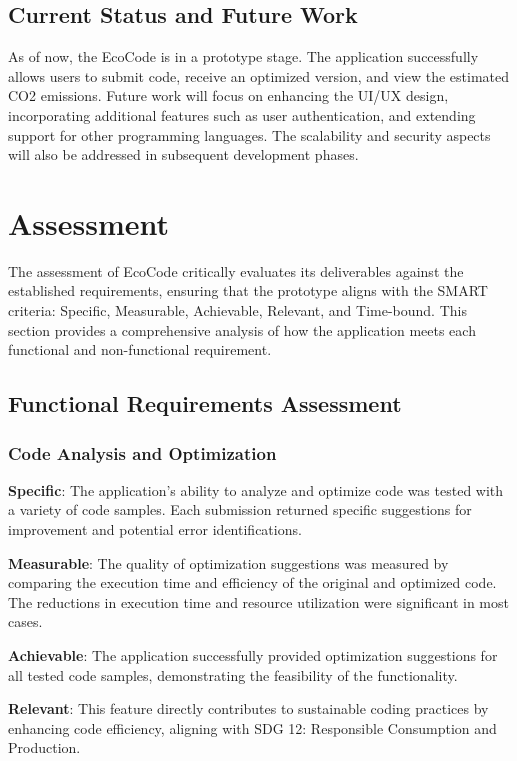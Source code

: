 \documentclass[conference,compsoc]{IEEEtran}
\begin{document}
\subsection{Current Status and Future Work}
As of now, the EcoCode is in a prototype stage. The application successfully allows users to submit  code, receive an optimized version, and view the estimated CO2 emissions. Future work will focus on enhancing the UI/UX design, incorporating additional features such as user authentication, and extending support for other programming languages. The scalability and security aspects will also be addressed in subsequent development phases.

\section{Assessment}
The assessment of EcoCode critically evaluates its deliverables against the established requirements, ensuring that the prototype aligns with the SMART criteria: Specific, Measurable, Achievable, Relevant, and Time-bound. This section provides a comprehensive analysis of how the application meets each functional and non-functional requirement.

\subsection{Functional Requirements Assessment}
\subsubsection{Code Analysis and Optimization}

\textbf{Specific}: The application's ability to analyze and optimize  code was tested with a variety of code samples. Each submission returned specific suggestions for improvement and potential error identifications.

\textbf{Measurable}: The quality of optimization suggestions was measured by comparing the execution time and efficiency of the original and optimized code. The reductions in execution time and resource utilization were significant in most cases.

\textbf{Achievable}: The application successfully provided optimization suggestions for all tested code samples, demonstrating the feasibility of the functionality.

\textbf{Relevant}: This feature directly contributes to sustainable coding practices by enhancing code efficiency, aligning with SDG 12: Responsible Consumption and Production.
\end{document}
